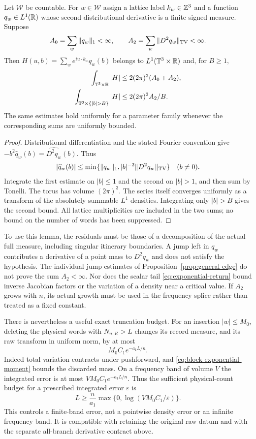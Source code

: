 \begin{lemma}
\label{lem:raw-residual-sum}
Let $\mathcal W$ be countable. For $w\in\mathcal W$ assign a lattice
label $k_w\in\mathbb Z^3$ and a function $q_w\in L^1(\mathbb R)$ whose second
distributional derivative is a finite signed measure. Suppose
\[
 A_0=\sum_w\|q_w\|_1<\infty,\qquad
 A_2=\sum_w\|D^2q_w\|_{\operatorname{TV}}<\infty.
\]
Then
$H(u,b)=\sum_w e^{iu\cdot k_w}\widehat q_w(b)$ belongs to
$L^1(\mathbb T^3\times\mathbb R)$ and, for $B\ge1$,
\begin{align}\label{eq:absolute-residual-sum}
 \int_{\T^3\times\R}|H|&\le2(2\pi)^3(A_0+A_2),\\
 \int_{\T^3\times\{|b|>B\}}|H|&\le2(2\pi)^3A_2/B.\nonumber
\end{align}
The same estimates hold uniformly for a parameter family whenever the
corresponding sums are uniformly bounded.
\end{lemma}
\begin{proof}
Distributional differentiation and the stated Fourier convention give
$-b^2\widehat q_w(b)=\widehat{D^2q_w}(b)$. Thus
\[
 |\widehat q_w(b)|\le\min\{\|q_w\|_1,
                    |b|^{-2}\|D^2q_w\|_{\operatorname{TV}}\}\quad(b\ne0).
\]
Integrate the first estimate on $|b|\le1$ and the second on $|b|>1$,
and then sum by Tonelli. The torus has volume $(2\pi)^3$.
The series itself converges uniformly as a transform of the absolutely
summable $L^1$ densities. Integrating only $|b|>B$ gives the second
bound. All lattice multiplicities are included in the two sums; no
bound on the number of words has been suppressed.
\end{proof}

To use this lemma, the residuals must be those of a decomposition of the
actual full measure, including singular itinerary boundaries. A jump left
in $q_w$ contributes a derivative of a point mass to $D^2q_w$ and does
not satisfy the hypothesis. The individual jump estimates of
Proposition~\ref{prop:general-edge} do not prove the sum $A_2<\infty$.
Nor does the scalar tail \eqref{eq:exponential-return} bound inverse
Jacobian factors or the variation of a density near a critical value.
If $A_2$ grows with $n$, its actual growth must be used in the frequency
splice rather than treated as a fixed constant.

There is nevertheless a useful exact truncation budget. For an insertion
$|w|\le M_0$, deleting the physical words with $N_{n,R}>L$ changes its
record measure, and its raw transform in uniform norm, by at most
\begin{equation}\label{eq:physical-count-truncation}
 M_0C_1e^{-a_1L/n}.
\end{equation}
Indeed total variation contracts under pushforward, and
\eqref{eq:block-exponential-moment} bounds the discarded mass.
On a frequency band of volume $V$ the integrated error is at most
$VM_0C_1e^{-a_1L/n}$. Thus the sufficient physical-count budget for a
prescribed integrated error $\varepsilon$ is
\[
 L\ge\frac{n}{a_1}\max\{0,\log(VM_0C_1/\varepsilon)\}.
\]
This controls a finite-band error, not a pointwise density error or an
infinite frequency band. It is compatible with retaining the original
raw datum and with the separate all-branch derivative contract above.
